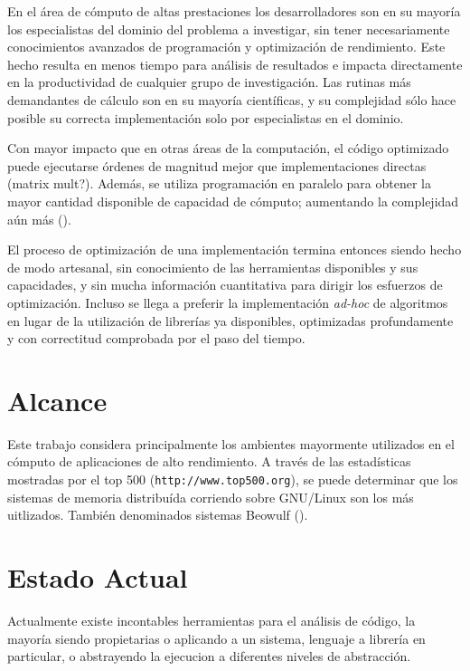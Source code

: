 \documentclass[a4paper]{report}
\begin{document}
En el \'area de c\'omputo de altas prestaciones los desarrolladores son en su mayor\'ia los
especialistas del dominio del problema a investigar, sin tener necesariamente conocimientos
avanzados de programaci\'on y optimizaci\'on de rendimiento. Este hecho resulta en menos tiempo para
an\'alisis de resultados e impacta directamente en la productividad de cualquier grupo de investigaci\'on.
Las rutinas m\'as demandantes de c\'alculo  son en su mayor\'ia cient\'ificas, y su complejidad s\'olo hace
posible su correcta implementaci\'on solo por especialistas en el dominio.

\bigskip

Con mayor impacto que en otras \'areas de la computaci\'on, el c\'odigo optimizado puede ejecutarse
\'ordenes de magnitud mejor que implementaciones directas (matrix mult?). Adem\'as, se utiliza programaci\'on
en paralelo para obtener la mayor cantidad disponible de capacidad de c\'omputo; aumentando la complejidad
a\'un m\'as (\cite{parallel-programming}).

\bigskip

El proceso de optimizaci\'on de una implementaci\'on termina entonces siendo hecho de modo artesanal,
sin conocimiento de las herramientas disponibles y sus capacidades, y sin mucha informaci\'on cuantitativa
para dirigir los esfuerzos de optimizaci\'on.
Incluso se llega a preferir la implementaci\'on {\em ad-hoc} de algoritmos en lugar de la utilizaci\'on
de librer\'ias ya disponibles, optimizadas profundamente y con correctitud comprobada por el paso del tiempo.

\section{Alcance}

Este trabajo considera principalmente los ambientes mayormente utilizados en el c\'omputo de aplicaciones de alto
rendimiento.
A trav\'es de las estad\'isticas mostradas por el top 500 ({\tt http://www.top500.org}),
se puede determinar que los sistemas de memoria distribu\'ida corriendo sobre GNU/Linux
son los m\'as uitlizados. Tambi\'en denominados sistemas Beowulf (\cite{beowulf}).

\section{Estado Actual}

Actualmente existe incontables herramientas para el an\'alisis de c\'odigo, la mayor\'ia siendo propietarias
o aplicando a un sistema, lenguaje a librer\'ia en particular, o abstrayendo la ejecucion a diferentes niveles de abstracci\'on.
\end{document}
